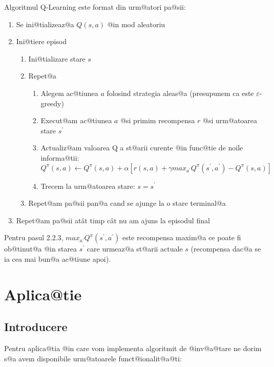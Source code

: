 Algoritmul Q-Learning este format din urm@atori pa@sii:

\begin{enumerate}
	\item Se ini@tializeaz@a $Q(s, a)$ @in mod aleatoriu
	\item Ini@tiere episod
	\begin{enumerate}[1.]
		\item Ini@tializare stare $s$
		\item Repet@a
		\begin{enumerate}[1.]
			\item Alegem ac@tiunea $a$ folosind strategia aleas@a (presupunem ca este $\varepsilon$-greedy)
			\item Execut@am ac@tiunea $a$ @si primim recompensa $r$ @si urm@atoarea stare $s^{\prime}$
			\item Actualiz@am valoarea Q a st@arii curente @in func@tie de noile informa@tii: \begin{equation}
			Q^{\pi}(s, a) \leftarrow Q^{\pi}(s, a) + \alpha \left[ r(s,a) + \gamma max_{a^{\prime}} Q^{\pi}(s^{\prime}, a^{\prime}) - Q^{\pi}(s, a) \right]
\end{equation}			
			\item Trecem la urm@atoarea stare: $s = s^{\prime}$
		\end{enumerate}
		\item Repet@am pa@sii pan@a cand se ajunge la o stare terminal@a
	\end{enumerate}	
	\item Repet@am pa@sii at\^at timp c\^ at nu am ajuns la episodul final	
\end{enumerate}

Pentru pasul 2.2.3, $max_{a^{\prime}} Q^{\pi}(s^{\prime}, a^{\prime})$ este recompensa maxim@a ce poate fi ob@tinut@a @in starea $s^{\prime}$ care urmeaz@a st@arii actuale $s$ (recompensa dac@a se ia cea mai bun@a ac@tiune apoi).

\chapter{Aplica@tie}

\section{Introducere}

Pentru aplica@tia @in care vom implementa algoritmit de @inv@a@tare ne dorim s@a avem disponibile urm@atoarele funct@ionalit@a@ti:

